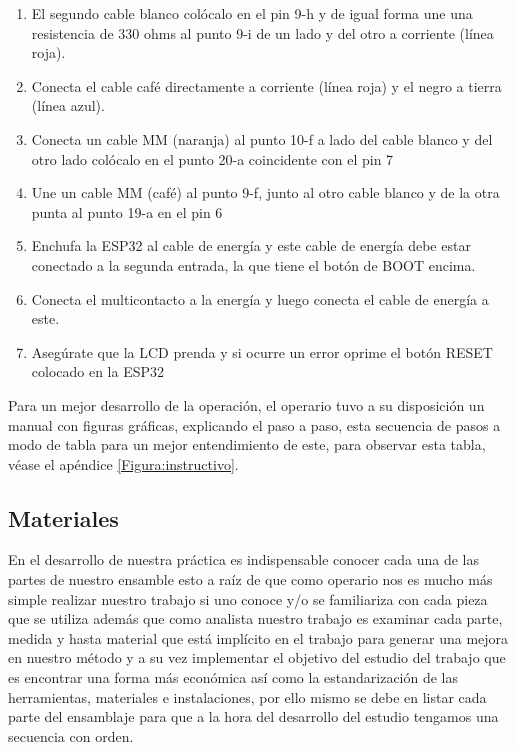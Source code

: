\begin{enumerate}
        \item El segundo cable blanco colócalo en el pin 9-h y de igual forma une una resistencia de 330 ohms al punto 9-i de un lado y del otro a corriente (línea roja).
    
        \item Conecta el cable café directamente a corriente (línea roja) y el negro a tierra (línea azul). 
    
        \item  Conecta un cable MM (naranja) al punto 10-f a lado del cable blanco y del otro lado colócalo en el punto 20-a coincidente con el pin 7
    
        \item Une un cable MM (café) al punto 9-f, junto al otro cable blanco y de la otra punta al punto 19-a en el pin 6 
    
        \item  Enchufa la ESP32 al cable de energía y este cable de energía debe estar conectado a la segunda entrada, la que tiene el botón de BOOT encima.
    
        \item Conecta el multicontacto a la energía y luego conecta el cable de energía a este.
    
    
        \item Asegúrate que la LCD prenda y si ocurre un error oprime el botón RESET colocado en la ESP32
    
    \end{enumerate}
    
    
    Para un mejor desarrollo de la operación, el operario tuvo a su disposición un manual con figuras gráficas, explicando el paso a paso, esta secuencia de pasos a modo de tabla para un mejor entendimiento de este, para observar esta tabla, véase el apéndice \ref{Figura:instructivo}.
    
    \newpage
    \subsection{Materiales}
    
    En el desarrollo de nuestra práctica es indispensable conocer cada una de las partes de nuestro ensamble esto a raíz de que como operario nos es mucho más simple realizar nuestro trabajo si uno conoce y/o se familiariza con cada pieza que se utiliza además que como analista nuestro trabajo es examinar cada parte, medida y hasta material que está implícito en el trabajo para generar una mejora en nuestro método y a su vez implementar el objetivo del estudio del trabajo que es encontrar una forma más económica así como la estandarización de las herramientas, materiales e instalaciones, por ello mismo se debe en listar cada parte del ensamblaje para que a la hora del desarrollo del estudio tengamos una secuencia con orden.
    
